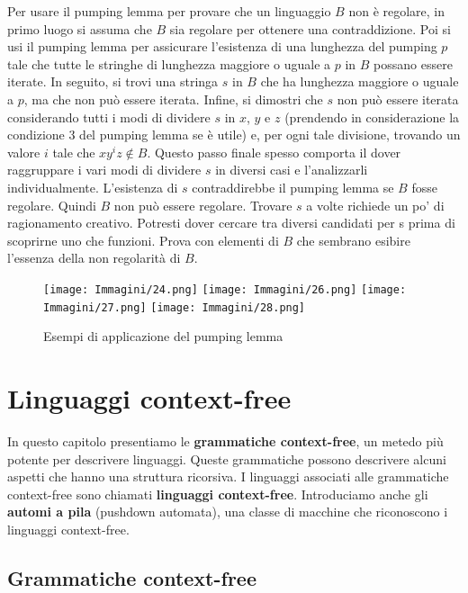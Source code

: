 \documentclass{article}
\begin{document}
Per usare il pumping lemma per provare che un linguaggio $B$ non è regolare, in primo luogo si assuma che $B$ sia regolare per ottenere una contraddizione. Poi si usi il pumping lemma per assicurare l'esistenza di una lunghezza del pumping $p$ tale che tutte le stringhe di lunghezza maggiore o uguale a $p$ in $B$ possano essere iterate. In seguito, si trovi una stringa $s$ in $B$ che ha lunghezza maggiore o uguale a $p$, ma che non può essere iterata. Infine, si dimostri che $s$ non può essere iterata considerando tutti i modi di dividere $s$ in $x$, $y$ e $z$ (prendendo in considerazione la condizione 3 del pumping lemma
se è utile) e, per ogni tale divisione, trovando un valore $i$ tale che $xy^{i}z \notin B$. Questo passo finale spesso comporta il dover raggruppare i vari modi di dividere $s$ in diversi casi e l'analizzarli individualmente. L'esistenza di $s$ contraddirebbe il pumping lemma se $B$ fosse regolare. Quindi $B$ non può essere regolare. Trovare $s$ a volte richiede un po' di ragionamento creativo. Potresti dover cercare tra diversi candidati per s prima di scoprirne uno che funzioni. Prova con elementi di $B$ che sembrano esibire l'essenza della non regolarità di $B$.

\begin{figure}[H]
    \centering
    \texttt{[image: Immagini/24.png]}
    \texttt{[image: Immagini/26.png]}
    \texttt{[image: Immagini/27.png]}
    \texttt{[image: Immagini/28.png]}
    \caption{Esempi di applicazione del pumping lemma}
    \label{fig:your_image}
\end{figure}
\newpage

\section{Linguaggi context-free}

In questo capitolo presentiamo le \textbf{grammatiche context-free}, un metedo più potente per descrivere linguaggi. Queste grammatiche possono descrivere alcuni aspetti che hanno una struttura ricorsiva.
I linguaggi associati alle grammatiche context-free sono chiamati \textbf{linguaggi context-free}.
Introduciamo anche gli \textbf{automi a pila} (pushdown automata), una classe di macchine che riconoscono i linguaggi context-free.

\subsection{Grammatiche context-free}
\end{document}

